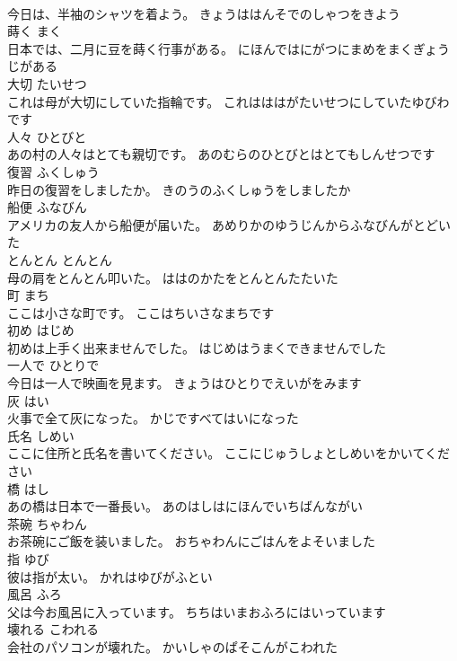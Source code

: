 \documentclass[8pt]{extreport}
\begin{document}
\begin{CJK}{UTF8}{min}
\\	今日は、半袖のシャツを着よう。	きょうははんそでのしゃつをきよう	
\\	蒔く	まく	
\\	日本では、二月に豆を蒔く行事がある。	にほんではにがつにまめをまくぎょうじがある	
\\	大切	たいせつ	
\\	これは母が大切にしていた指輪です。	これはははがたいせつにしていたゆびわです	
\\	人々	ひとびと	
\\	あの村の人々はとても親切です。	あのむらのひとびとはとてもしんせつです	
\\	復習	ふくしゅう	
\\	昨日の復習をしましたか。	きのうのふくしゅうをしましたか	
\\	船便	ふなびん	
\\	アメリカの友人から船便が届いた。	あめりかのゆうじんからふなびんがとどいた	
\\	とんとん	とんとん	
\\	母の肩をとんとん叩いた。	ははのかたをとんとんたたいた	
\\	町	まち	
\\	ここは小さな町です。	ここはちいさなまちです	
\\	初め	はじめ	
\\	初めは上手く出来ませんでした。	はじめはうまくできませんでした	
\\	一人で	ひとりで	
\\	今日は一人で映画を見ます。	きょうはひとりでえいがをみます	
\\	灰	はい	
\\	火事で全て灰になった。	かじですべてはいになった	
\\	氏名	しめい	
\\	ここに住所と氏名を書いてください。	ここにじゅうしょとしめいをかいてください	
\\	橋	はし	
\\	あの橋は日本で一番長い。	あのはしはにほんでいちばんながい	
\\	茶碗	ちゃわん	
\\	お茶碗にご飯を装いました。	おちゃわんにごはんをよそいました	
\\	指	ゆび	
\\	彼は指が太い。	かれはゆびがふとい	
\\	風呂	ふろ	
\\	父は今お風呂に入っています。	ちちはいまおふろにはいっています	
\\	壊れる	こわれる	
\\	会社のパソコンが壊れた。	かいしゃのぱそこんがこわれた	

\end{CJK}
\end{document}
